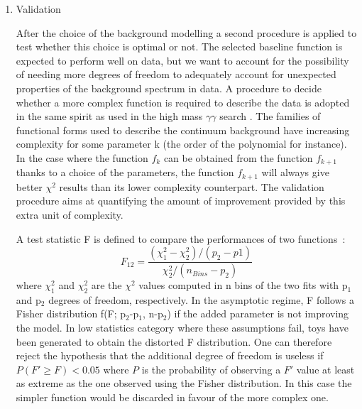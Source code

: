 \begin{enumerate}
\begin{enumerate}
\item Validation
  \label{sec:orgd9c84d4}

  After the choice of the background modelling a second procedure is applied to test whether this choice is optimal or not.
  The selected baseline function is expected to perform well on data, but we want to account for the possibility of needing more degrees of freedom to adequately account for unexpected properties of the background spectrum in data.
  A procedure to decide whether a more complex function is required to describe the data is adopted in the same spirit as used in the high mass $\gamma\gamma$ search \cite{ATL-COM-PHYS-2015-1246}.
  The families of functional forms used to describe the continuum background have increasing complexity for some parameter k (the order of the polynomial for instance).
  In the case where the function $f_k$ can be obtained from the function $f_{k+1}$ thanks to a choice of the parameters, the function $f_{k+1}$ will always give better \(\chi^{\text{2}}\) results than its lower complexity counterpart.
  The validation procedure aims at quantifying the amount of improvement provided by this extra unit of complexity.

A test statistic F is defined to compare the performances of two functions~:
\begin{equation}
F_{12} = \frac{(\chi^2_1 - \chi^2_2)/(p_2-p1)}{\chi^2_2/(n_{Bins}-p_2)}
\end{equation}
where \(\chi_{\text{1}}^{\text{2}}\) and \(\chi^{\text{2}}_{\text{2}}\) are the \(\chi^{\text{2}}\) values computed in n bins of the two fits with p\(_{\text{1}}\) and p\(_{\text{2}}\) degrees of freedom, respectively.
In the asymptotic regime, F follows a Fisher distribution f(F; p\(_{\text{2}}\)-p\(_{\text{1}}\), n-p\(_{\text{2}}\)) if the added parameter is not improving the model.
In low statistics category where these assumptions fail, toys have been generated to obtain the distorted F distribution.
One can therefore reject the hypothesis that the additional degree of freedom is useless if $P(F'\geq F)<0.05$ where $P$ is the probability of observing a $F'$ value at least as extreme as the one observed using the Fisher distribution.
In this case the simpler function would be discarded in favour of the more complex one.
\end{enumerate}
\end{enumerate}

